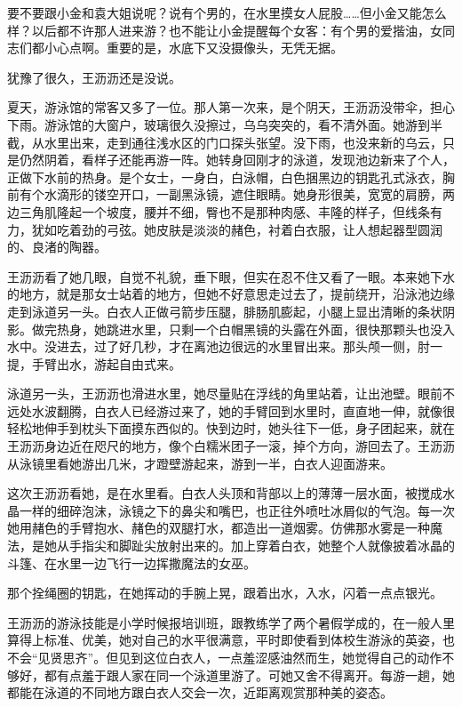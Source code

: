 \documentclass[lang=cn,newtx,12pt,scheme=chinese]{elegantbook}
\begin{document}
要不要跟小金和袁大姐说呢？说有个男的，在水里摸女人屁股……但小金又能怎么样？以后都不许那人进来游？也不能让小金提醒每个女客：有个男的爱揩油，女同志们都小心点啊。重要的是，水底下又没摄像头，无凭无据。

犹豫了很久，王沥沥还是没说。

夏天，游泳馆的常客又多了一位。那人第一次来，是个阴天，王沥沥没带伞，担心下雨。游泳馆的大窗户，玻璃很久没擦过，乌乌突突的，看不清外面。她游到半截，从水里出来，走到通往浅水区的门口探头张望。没下雨，也没来新的乌云，只是仍然阴着，看样子还能再游一阵。她转身回刚才的泳道，发现池边新来了个人，正做下水前的热身。是个女士，一身白，白泳帽，白色捆黑边的钥匙孔式泳衣，胸前有个水滴形的镂空开口，一副黑泳镜，遮住眼睛。她身形很美，宽宽的肩膀，两边三角肌隆起一个坡度，腰并不细，臀也不是那种肉感、丰隆的样子，但线条有力，犹如吃着劲的弓弦。她皮肤是淡淡的赭色，衬着白衣服，让人想起器型圆润的、良渚的陶器。

王沥沥看了她几眼，自觉不礼貌，垂下眼，但实在忍不住又看了一眼。本来她下水的地方，就是那女士站着的地方，但她不好意思走过去了，提前绕开，沿泳池边缘走到泳道另一头。白衣人正做弓箭步压腿，腓肠肌膨起，小腿上显出清晰的条状阴影。做完热身，她跳进水里，只剩一个白帽黑镜的头露在外面，很快那颗头也没入水中。没进去，过了好几秒，才在离池边很远的水里冒出来。那头颅一侧，肘一提，手臂出水，游起自由式来。

泳道另一头，王沥沥也滑进水里，她尽量贴在浮线的角里站着，让出池壁。眼前不远处水波翻腾，白衣人已经游过来了，她的手臂回到水里时，直直地一伸，就像很轻松地伸手到枕头下面摸东西似的。快到边时，她头往下一低，身子团起来，就在王沥沥身边近在咫尺的地方，像个白糯米团子一滚，掉个方向，游回去了。王沥沥从泳镜里看她游出几米，才蹬壁游起来，游到一半，白衣人迎面游来。

这次王沥沥看她，是在水里看。白衣人头顶和背部以上的薄薄一层水面，被搅成水晶一样的细碎泡沫，泳镜之下的鼻尖和嘴巴，也正往外喷吐冰屑似的气泡。每一次她用赭色的手臂抱水、赭色的双腿打水，都造出一道烟雾。仿佛那水雾是一种魔法，是她从手指尖和脚趾尖放射出来的。加上穿着白衣，她整个人就像披着冰晶的斗篷、在水里一边飞行一边挥撒魔法的女巫。

那个拴绳圈的钥匙，在她挥动的手腕上晃，跟着出水，入水，闪着一点点银光。

王沥沥的游泳技能是小学时候报培训班，跟教练学了两个暑假学成的，在一般人里算得上标准、优美，她对自己的水平很满意，平时即使看到体校生游泳的英姿，也不会“见贤思齐”。但见到这位白衣人，一点羞涩感油然而生，她觉得自己的动作不够好，都有点羞于跟人家在同一个泳道里游了。可她又舍不得离开。每游一趟，她都能在泳道的不同地方跟白衣人交会一次，近距离观赏那种美的姿态。
\end{document}
